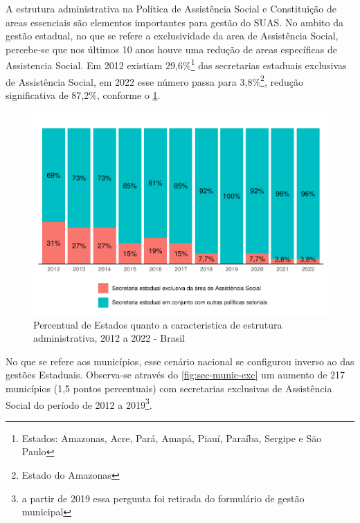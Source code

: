 \documentclass[
  brazilian]{report}
\begin{document}
A estrutura administrativa na Política de Assistência Social e
Constituição de areas essenciais são elementos importantes para gestão
do SUAS. No ambito da gestão estadual, no que se refere a exclusividade
da area de Assistência Social, percebe-se que nos últimos 10 anos houve
uma redução de areas específicas de Assistencia Social. Em 2012 existiam
29,6\%\footnote{Estados: Amazonas, Acre, Pará, Amapá, Piauí, Paraíba, Sergipe e São Paulo}
das secretarias estaduais exclusivas de Assistência Social, em 2022 esse
número passa para 3,8\%\footnote{Estado do Amazonas}, redução
significativa de 87,2\%, conforme o \cref{fig:estados_sec_exc}.

\begin{figure}
\includegraphics{Censo-SUAS-2022_files/figure-latex/estados_sec_exc-1} \caption[Percentual de Estados quanto a caracteristica de estrutura administrativa, 2012 a 2022 - Brasil]{Percentual de Estados quanto a caracteristica de estrutura administrativa, 2012 a 2022 - Brasil}\label{fig:estados_sec_exc}
\end{figure}

No que se refere aos municípios, esse cenário nacional se configurou
inverso ao das gestões Estaduais. Observa-se através do
\cref{fig:sec-munic-exc} um aumento de 217 municípios (1,5 pontos
percentuais) com secretarias exclusivas de Assistência Social do período
de 2012 a
2019\footnote{a partir de 2019 essa pergunta foi retirada do formulário de gestão municipal}.
\end{document}
